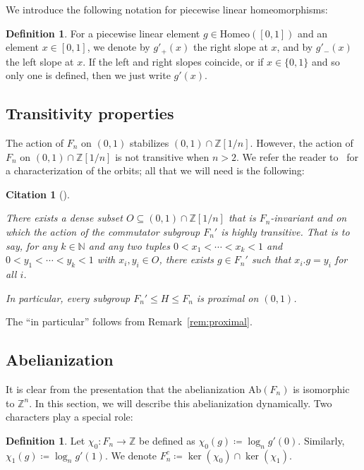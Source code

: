 \documentclass[10pt,a4paper]{article}
\theoremstyle{definition}
\newtheorem{defi}[cdrthm]{Definition}
\theoremstyle{remark}
\newcommand{\N}{\mathbb{N}}
\newcommand{\Z}{\mathbb{Z}}
\newcommand{\Ab}{\mathrm{Ab}}
\newcommand{\Homeo}{\mathrm{Homeo}}
\theoremstyle{plain}
\newtheorem{cit}[cdrthm]{Citation}
\begin{document}
We introduce the following notation for piecewise linear homeomorphisms:

\begin{defi}
For a piecewise linear element $g \in \Homeo([0, 1])$ and an element $x \in [0, 1]$, we denote by $g'_+(x)$ the right slope at $x$, and by $g'_-(x)$ the left slope at $x$. If the left and right slopes coincide, or if $x \in \{0, 1\}$ and so only one is defined, then we just write $g'(x)$.
\end{defi}


\subsection{Transitivity properties}

The action of $F_n$ on $(0,1)$ stabilizes $(0,1)\cap \Z[1/n]$. However, the action of $F_n$ on $(0,1)\cap \Z[1/n]$ is not transitive when $n > 2$. We refer the reader to~\cite[Section 3]{hydelodha} for a characterization of the orbits; all that we will need is the following:

\begin{cit}[{\cite[Section 3]{hydelodha}}]
\label{cit:proximal}

There exists a dense subset $O \subseteq (0, 1) \cap \Z[1/n]$ that is $F_n$-invariant and on which the action of the commutator subgroup $F_n'$ is highly transitive. That is to say, for any $k\in\N$ and any two tuples $0 < x_1 < \cdots < x_k < 1$ and $0 < y_1 < \cdots < y_k < 1$ with $x_i, y_i \in O$, there exists $g \in F_n'$ such that $x_i.g = y_i$ for all $i$.

In particular, every subgroup $F_n' \leq H \leq F_n$ is proximal on $(0, 1)$.
\end{cit}

The ``in particular'' follows from Remark~\ref{rem:proximal}.


\subsection{Abelianization}

It is clear from the presentation that the abelianization $\Ab(F_n)$ is isomorphic to $\Z^n$. In this section, we will describe this abelianization dynamically. Two characters play a special role:

\begin{defi}
\label{def:chi01}
    Let $\chi_0 \colon F_n \to \Z$ be 	defined as $\chi_0(g) \coloneqq \log_n g'(0)$. Similarly, $\chi_1(g) \coloneqq \log_n g'(1)$. We denote $F_n^c \coloneqq \ker(\chi_0) \cap \ker(\chi_1)$.
\end{defi}
\end{document}
